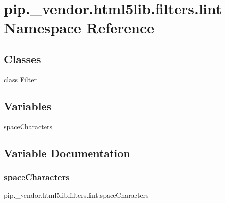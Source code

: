 \hypertarget{namespacepip_1_1__vendor_1_1html5lib_1_1filters_1_1lint}{}\section{pip.\+\_\+vendor.\+html5lib.\+filters.\+lint Namespace Reference}
\label{namespacepip_1_1__vendor_1_1html5lib_1_1filters_1_1lint}
\subsection*{Classes}
\begin{DoxyCompactItemize}
\item 
class \hyperlink{classpip_1_1__vendor_1_1html5lib_1_1filters_1_1lint_1_1Filter}{Filter}
\end{DoxyCompactItemize}
\subsection*{Variables}
\begin{DoxyCompactItemize}
\item 
\hyperlink{namespacepip_1_1__vendor_1_1html5lib_1_1filters_1_1lint_a33476f60052b16bef427148f3bfcf263}{space\+Characters}
\end{DoxyCompactItemize}


\subsection{Variable Documentation}
\mbox{\label{namespacepip_1_1__vendor_1_1html5lib_1_1filters_1_1lint_a33476f60052b16bef427148f3bfcf263}} 
\subsubsection{\texorpdfstring{space\+Characters}{spaceCharacters}}
{\footnotesize\ttfamily pip.\+\_\+vendor.\+html5lib.\+filters.\+lint.\+space\+Characters}

